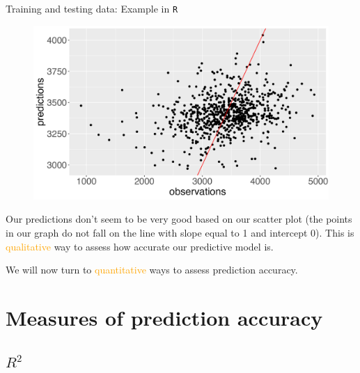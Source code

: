 \documentclass[10pt,t]{beamer}
\begin{document}
\begin{frame}{Training and testing data: Example in \texttt{R}}
\begin{figure}
	\centering \includegraphics[scale=0.3]{figures/predict_vs_obs2.png}
\end{figure}

Our predictions don't seem to be very good based on our scatter plot (the points in our graph do not fall on the line with slope equal to 1 and intercept 0). This is \textcolor{orange}{qualitative} way to assess how accurate our predictive model is.

\vspace{0.3cm}

We will now turn to \textcolor{orange}{quantitative} ways to assess prediction accuracy.
\end{frame}


\section{Measures of prediction accuracy}

\subsection{$R^2$}
\end{document}
